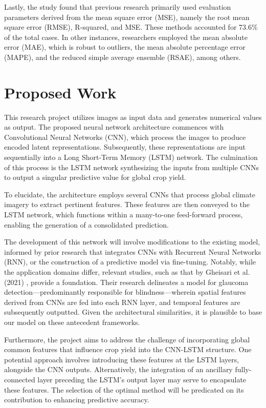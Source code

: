 \documentclass[11pt, oneside]{article}   	%
\begin{document}
Lastly, the study found that previous research primarily used evaluation parameters derived from the mean square error (MSE), namely the root mean square error (RMSE), R-squared, and MSE. These methods accounted for 73.6\% of the total cases. In other instances, researchers employed the mean absolute error (MAE), which is robust to outliers, the mean absolute percentage error (MAPE), and the reduced simple average ensemble (RSAE), among others.

\section*{Proposed Work}

This research project utilizes images as input data and generates numerical values as output. The proposed neural network architecture commences with Convolutional Neural Networks (CNN), which process the images to produce encoded latent representations. Subsequently, these representations are input sequentially into a Long Short-Term Memory (LSTM) network. The culmination of this process is the LSTM network synthesizing the inputs from multiple CNNs to output a singular predictive value for global crop yield.

To elucidate, the architecture employs several CNNs that process global climate imagery to extract pertinent features. These features are then conveyed to the LSTM network, which functions within a many-to-one feed-forward process, enabling the generation of a consolidated prediction.

The development of this network will involve modifications to the existing model, informed by prior research that integrates CNNs with Recurrent Neural Networks (RNN), or the construction of a predictive model via fine-tuning. Notably, while the application domains differ, relevant studies, such as that by Gheisari et al. (2021) \cite{citation_key2}, provide a foundation. Their research delineates a model for glaucoma detection—predominantly responsible for blindness—wherein spatial features derived from CNNs are fed into each RNN layer, and temporal features are subsequently outputted. Given the architectural similarities, it is plausible to base our model on these antecedent frameworks.

Furthermore, the project aims to address the challenge of incorporating global common features that influence crop yield into the CNN-LSTM structure. One potential approach involves introducing these features at the LSTM layers, alongside the CNN outputs. Alternatively, the integration of an ancillary fully-connected layer preceding the LSTM’s output layer may serve to encapsulate these features. The selection of the optimal method will be predicated on its contribution to enhancing predictive accuracy.
\end{document}
